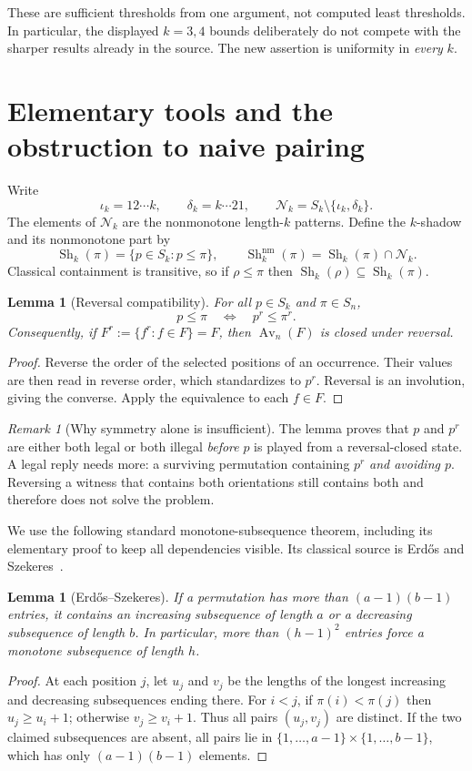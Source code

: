 \documentclass[11pt,a4paper]{article}
\newtheorem{lemma}[theorem]{Lemma}
\theoremstyle{definition}
\theoremstyle{remark}
\newtheorem{remark}[theorem]{Remark}
\DeclareMathOperator{\Av}{Av}
\DeclareMathOperator{\Sh}{Sh}
\newcommand{\Nk}{\mathcal N_k}
\newcommand{\id}{\iota}
\newcommand{\decr}{\delta}
\newcommand{\shn}[1]{\Sh_k^{\mathrm{nm}}(#1)}
\begin{document}
These are sufficient thresholds from one argument, not computed least
thresholds. In particular, the displayed $k=3,4$ bounds deliberately do not
compete with the sharper results already in the source. The new assertion is
uniformity in \emph{every} $k$.

\section{Elementary tools and the obstruction to naive pairing}
\label{sec:prelim}

Write
\[
 \id_k=12\cdots k,\qquad \decr_k=k\cdots21,\qquad
 \Nk=S_k\setminus\{\id_k,\decr_k\}.
\]
The elements of $\Nk$ are the nonmonotone length-$k$ patterns. Define the
$k$-shadow and its nonmonotone part by
\[
 \Sh_k(\pi)=\{p\in S_k:p\le\pi\},\qquad
 \shn{\pi}=\Sh_k(\pi)\cap\Nk.
\]
Classical containment is transitive, so if $\rho\le\pi$ then
$\Sh_k(\rho)\subseteq\Sh_k(\pi)$.

\begin{lemma}[Reversal compatibility]\label{lem:reversal}
For all $p\in S_k$ and $\pi\in S_n$,
\[
 p\le\pi\quad\Longleftrightarrow\quad p^r\le\pi^r.
\]
Consequently, if $F^r:=\{f^r:f\in F\}=F$, then $\Av_n(F)$ is closed under
reversal.
\end{lemma}
\begin{proof}
Reverse the order of the selected positions of an occurrence. Their values
are then read in reverse order, which standardizes to $p^r$. Reversal is an
involution, giving the converse. Apply the equivalence to each $f\in F$.
\end{proof}

\begin{remark}[Why symmetry alone is insufficient]
The lemma proves that $p$ and $p^r$ are either both legal or both illegal
\emph{before} $p$ is played from a reversal-closed state. A legal reply needs
more: a surviving permutation containing $p^r$ \emph{and avoiding $p$}.
Reversing a witness that contains both orientations still contains both and
therefore does not solve the problem.
\end{remark}

We use the following standard monotone-subsequence theorem, including its
elementary proof to keep all dependencies visible. Its classical source is
Erd\H{o}s and Szekeres~\cite{ES}.

\begin{lemma}[Erd\H{o}s--Szekeres]\label{lem:es}
If a permutation has more than $(a-1)(b-1)$ entries, it contains an
increasing subsequence of length $a$ or a decreasing subsequence of length
$b$. In particular, more than $(h-1)^2$ entries force a monotone subsequence
of length $h$.
\end{lemma}
\begin{proof}
At each position $j$, let $u_j$ and $v_j$ be the lengths of the longest
increasing and decreasing subsequences ending there. For $i<j$, if
$\pi(i)<\pi(j)$ then $u_j\ge u_i+1$; otherwise $v_j\ge v_i+1$. Thus all pairs
$(u_j,v_j)$ are distinct. If the two claimed subsequences are absent, all
pairs lie in $\{1,\ldots,a-1\}\times\{1,\ldots,b-1\}$, which has only
$(a-1)(b-1)$ elements.
\end{proof}
\end{document}
